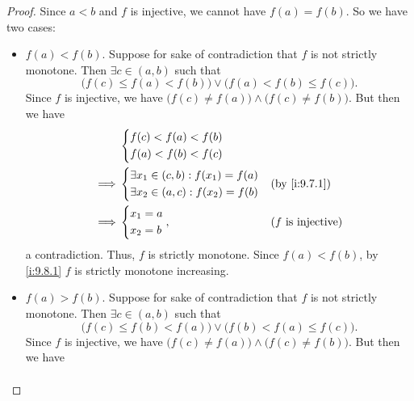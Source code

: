 \begin{proof}
  Since \(a < b\) and \(f\) is injective, we cannot have \(f(a) = f(b)\).
  So we have two cases:
  \begin{itemize}
    \item \(f(a) < f(b)\).
          Suppose for sake of contradiction that \(f\) is not strictly monotone.
          Then \(\exists c \in (a, b)\) such that
          \[
            \big(f(c) \leq f(a) < f(b)\big) \lor \big(f(a) < f(b) \leq f(c)\big).
          \]
          Since \(f\) is injective, we have \(\big(f(c) \neq f(a)\big) \land \big(f(c) \neq f(b)\big)\).
          But then we have
          \begin{align*}
                     & \begin{dcases}
                         f(c) < f(a) < f(b) \\
                         f(a) < f(b) < f(c)
                       \end{dcases}                                                        \\
            \implies & \begin{dcases}
                         \exists x_1 \in (c, b) : f(x_1) = f(a) \\
                         \exists x_2 \in (a, c) : f(x_2) = f(b) \\
                       \end{dcases} &  & \by{i:9.7.1}                                    \\
            \implies & \begin{dcases}
                         x_1 = a \\
                         x_2 = b
                       \end{dcases},                            &  & \text{(\(f\) is injective)}
          \end{align*}
          a contradiction.
          Thus, \(f\) is strictly monotone.
          Since \(f(a) < f(b)\), by \cref{i:9.8.1} \(f\) is strictly monotone increasing.
    \item \(f(a) > f(b)\).
          Suppose for sake of contradiction that \(f\) is not strictly monotone.
          Then \(\exists c \in (a, b)\) such that
          \[
            \big(f(c) \leq f(b) < f(a)\big) \lor \big(f(b) < f(a) \leq f(c)\big).
          \]
          Since \(f\) is injective, we have \(\big(f(c) \neq f(a)\big) \land \big(f(c) \neq f(b)\big)\).
          But then we have
          \begin{align*}

\end{align*}
\end{itemize}
\end{proof}
